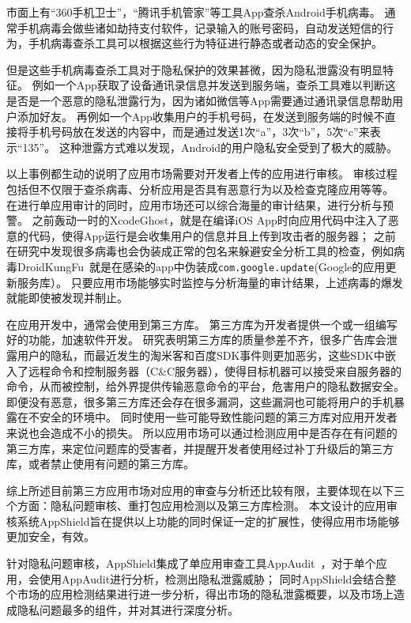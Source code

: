 市面上有“360手机卫士”，“腾讯手机管家”等工具App查杀Android手机病毒。
通常手机病毒会做些诸如劫持支付软件，记录输入的账号密码，自动发送短信的行为，手机病毒查杀工具可以根据这些行为特征进行静态或者动态的安全保护。

但是这些手机病毒查杀工具对于隐私保护的效果甚微，因为隐私泄露没有明显特征。
例如一个App获取了设备通讯录信息并发送到服务端，查杀工具难以判断这是否是一个恶意的隐私泄露行为，因为诸如微信等App需要通过通讯录信息帮助用户添加好友。
再例如一个App收集用户的手机号码，在发送到服务端的时候不直接将手机号码放在发送的内容中，而是通过发送1次“a”，3次“b”，5次“c”来表示“135”。
这种泄露方式难以发现，Android的用户隐私安全受到了极大的威胁。

以上事例都生动的说明了应用市场需要对开发者上传的应用进行审核。
审核过程包括但不仅限于查杀病毒、分析应用是否具有恶意行为以及检查克隆应用等等。
在进行单应用审计的同时，应用市场还可以综合海量的审计结果，进行分析与预警。
之前轰动一时的XcodeGhost，就是在编译iOS App时向应用代码中注入了恶意的代码，使得App运行是会收集用户的信息并且上传到攻击者的服务器；
之前在研究中发现很多病毒也会伪装成正常的包名来躲避安全分析工具的检查，例如病毒DroidKungFu~\supercite{kungfu}就是在感染的app中伪装成\texttt{com.google.update}(Google的应用更新服务库）。
只要应用市场能够实时监控与分析海量的审计结果，上述病毒的爆发就能即使被发现并制止。

在应用开发中，通常会使用到第三方库。
第三方库为开发者提供一个或一组编写好的功能，加速软件开发。
研究表明第三方库的质量参差不齐，很多广告库会泄露用户的隐私，而最近发生的淘米客和百度SDK事件则更加恶劣，这些SDK中嵌入了远程命令和控制服务器（C\&C服务器），使得目标机器可以接受来自服务器的命令，从而被控制，给外界提供传输恶意命令的平台，危害用户的隐私数据安全。
即便没有恶意，很多第三方库还会存在很多漏洞，这些漏洞也可能将用户的手机暴露在不安全的环境中。
同时使用一些可能导致性能问题的第三方库对应用开发者来说也会造成不小的损失。
所以应用市场可以通过检测应用中是否存在有问题的第三方库，来定位问题库的受害者，并提醒开发者使用经过补丁升级后的第三方库，或者禁止使用有问题的第三方库。

综上所述目前第三方应用市场对应用的审查与分析还比较有限，主要体现在以下三个方面：隐私问题审核、重打包应用检测以及第三方库检测。
本文设计的应用审核系统AppShield旨在提供以上功能的同时保证一定的扩展性，使得应用市场能够更加安全，有效。

针对隐私问题审核，AppShield集成了单应用审查工具AppAudit~\supercite{appaudit}，对于单个应用，会使用AppAudit进行分析，检测出隐私泄露威胁；
同时AppShield会结合整个市场的应用检测结果进行进一步分析，得出市场的隐私泄露概要，以及市场上造成隐私问题最多的组件，并对其进行深度分析。

